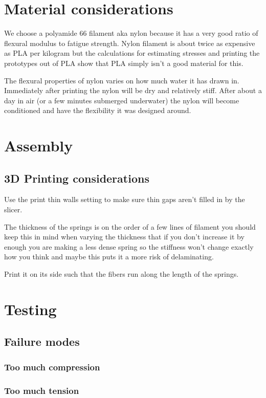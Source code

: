 \documentclass{article}
\begin{document}
\section{Material considerations}
We choose a polyamide 66 filament aka nylon because it has a very good ratio of flexural modulus to fatigue strength. Nylon filament is about twice as expensive as PLA per kilogram but the calculations for estimating stresses and printing the prototypes out of PLA show that PLA simply isn't a good material for this.

The flexural properties of nylon varies on how much water it has drawn in. Immediately after printing the nylon will be dry and relatively stiff. After about a day in air (or a few minutes submerged underwater) the nylon will become conditioned and have the flexibility it was designed around.

\section{Assembly}
\subsection{3D Printing considerations}
Use the print thin walls setting to make sure thin gaps aren't filled in by the slicer.

The thickness of the springs is on the order of a few lines of filament you should keep this in mind when varying the thickness that if you don't increase it by enough you are making a less dense spring so the stiffness won't change exactly how you think and maybe this puts it a more risk of delaminating.

Print it on its side such that the fibers run along the length of the springs.



\section{Testing}
\subsection{Failure modes}
\subsubsection{Too much compression}
\subsubsection{Too much tension}
\end{document}
